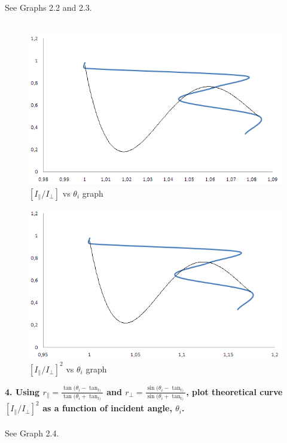 \documentclass[a4paper,12pt]{report}
\begin{document}
See Graphs 2.2 and 2.3.\\\\
\begin{figure}[h!]
\centering
\includegraphics[width=1.0\linewidth, height=0.4\textheight]{g2}
\caption{$[I_{\parallel}/I_{\perp}]$ vs $\theta_{i}$ graph}
\label{fig:g2}
\end{figure}
\begin{figure}[h!]
\centering
\includegraphics[width=1.0\linewidth, height=0.4\textheight]{g3}
\caption{$[I_{\parallel}/I_{\perp}]^{2}$ vs $\theta_{i}$ graph}
\label{fig:g3}
\end{figure}
\textbf{4. Using $r_{\parallel}=\frac{\tan(\theta_{i}-\tan_{t)}}{\tan(\theta_{i}+\tan_{t)}}$ and $r_{\perp}=\frac{\sin(\theta_{i}-\tan_{t)}}{\sin(\theta_{i}+\tan_{t)}}$, plot theoretical curve $[I_{\parallel}/I_{\perp}]^{2}$ as a function of incident angle, $\theta_{i}$.}\\\\
See Graph 2.4.\\\\
\end{document}

